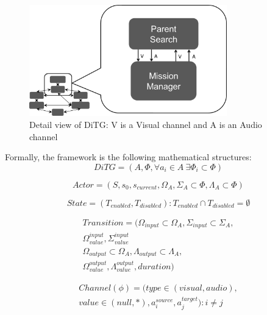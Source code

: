 \begin{figure}
\center
\setlength{\abovecaptionskip}{1mm}
\setlength{\belowcaptionskip}{1mm}
\setlength{\textfloatsep}{1mm}
\setlength{\floatsep}{1mm}
\includegraphics[height=1.9in]{ditg_detailed.png}
\caption{Detail view of DiTG: V is a Visual channel and A is an Audio channel}
\label{fig:ditg_detail}
\end{figure}

Formally, the framework is the following mathematical structures:
 \begin{equation}
 	DiTG = (A, \Phi, \forall a_i \in A~ \exists \Phi_i \subset \Phi)
 \end{equation}

 \begin{equation}
 	Actor = (S, s_0, s_{current}, \Omega_A, \Sigma_A \subset \Phi, \Lambda_A
 	\subset \Phi)
 \label{eq:actor}
 \end{equation}

 \begin{equation}
	State = (T_{enabled}, T_{disabled}) : T_{enabled} \cap T_{disabled} = \emptyset
 \label{eq:state}
\end{equation}

\begin{equation}
\begin{split}
	Transition = (\Omega_{input} \subset \Omega_A, \Sigma_{input} \subset \Sigma_A,\\
	\Omega_{value}^{input}, \Sigma_{value}^{input} \\
	\Omega_{output} \subset \Omega_A, \Lambda_{output} \subset \Lambda_A, \\
	\Omega_{value}^{output}, \Lambda_{value}^{output}, duration)
 \label{eq:transition}
 \end{split}
\end{equation}

\begin{equation}
\begin{split}
Channel (\phi) = (type \in (visual, audio), \\
value \in (null, *), 
 a_i^{source}, a_j^{target}) : i \neq j
 \label{eq:channel}
 \end{split}
\end{equation}

